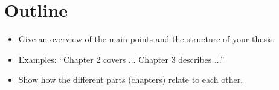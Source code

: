 \section{Outline}

\begin{instructions}
\begin{itemize}
\item Give an overview of the main points and the structure of your thesis.
\item Examples: ``Chapter 2 covers ...  Chapter 3 describes ...''
\item Show how the different parts (chapters) relate to each other.
\end{itemize}
\end{instructions}
